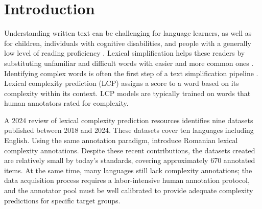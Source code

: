 \documentclass[11pt]{article}
\begin{document}
\section{Introduction}
\label{sec:intro}

Understanding written text can be challenging for language learners, as well as for children, individuals with cognitive disabilities, and people with a generally low level of reading proficiency \citep{saggion-etal-2024-lexical}. Lexical simplification helps these readers by substituting unfamiliar and difficult words with easier and more common ones \citep{saggion-etal-2024-lexical}. Identifying complex words is often the first step of a text simplification pipeline \citep{qiu-etal-2024-complex}. Lexical complexity prediction (LCP) assigns a score to a word based on its complexity within its context. LCP models are typically trained on words that human annotators rated for complexity.

A 2024 review of lexical complexity prediction resources \citep{shardlow-etal-2024-multilingual} identifies nine datasets published between 2018 and 2024. These datasets cover ten languages including English. Using the same annotation paradigm, \citet{anghel-etal-2025-rals} introduce Romanian lexical complexity annotations. Despite these recent contributions, the datasets created are relatively small by today's standards, covering approximately 670 annotated items. At the same time, many languages still lack complexity annotations; the data acquisition process requires a labor-intensive human annotation protocol, and the annotator pool must be well calibrated to provide adequate complexity predictions for specific target groups.
\end{document}
